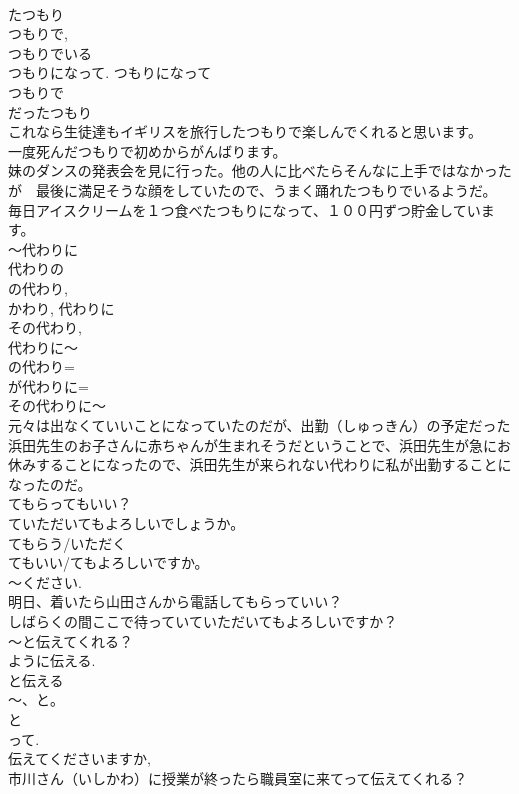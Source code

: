 \documentclass[8pt]{extreport}
\begin{document}
\begin{CJK}{UTF8}{min}
\\	たつもり
\\	つもりで, 
\\	つもりでいる 
\\	つもりになって. つもりになって 
\\	つもりで 
\\	だったつもり
\\	これなら生徒達もイギリスを旅行したつもりで楽しんでくれると思います。
\\	一度死んだつもりで初めからがんばります。
\\	妹のダンスの発表会を見に行った。他の人に比べたらそんなに上手ではなかったが　最後に満足そうな顔をしていたので、うまく踊れたつもりでいるようだ。
\\	毎日アイスクリームを１つ食べたつもりになって、１００円ずつ貯金しています。
\\	～代わりに
\\	代わりの
\\	の代わり, 
\\	かわり, 代わりに
\\	その代わり, 
\\	代わりに～
\\	の代わり= 
\\	が代わりに= 
\\	その代わりに～
\\	元々は出なくていいことになっていたのだが、出勤（しゅっきん）の予定だった浜田先生のお子さんに赤ちゃんが生まれそうだということで、浜田先生が急にお休みすることになったので、浜田先生が来られない代わりに私が出勤することになったのだ。	
\\	てもらってもいい？
\\	ていただいてもよろしいでしょうか。
\\	てもらう/いただく 
\\	てもいい/てもよろしいですか。
\\	～ください.
\\	明日、着いたら山田さんから電話してもらっていい？
\\	しばらくの間ここで待っていていただいてもよろしいですか？
\\	～と伝えてくれる？
\\	ように伝える.
\\	と伝える 
\\	～、と。
\\	と 
\\	って.
\\	伝えてくださいますか, 
\\	市川さん（いしかわ）に授業が終ったら職員室に来てって伝えてくれる？

\end{CJK}
\end{document}
